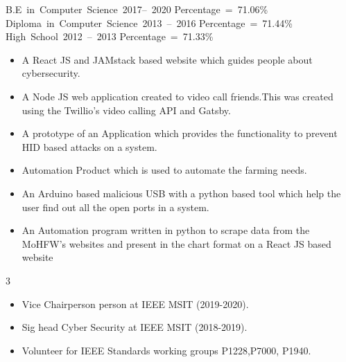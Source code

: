 \hbox {B.E  in Computer Science 2017-- 2020}
\hbox {Percentage = 71.06\%}
\hbox {Diploma in Computer Science   2013 -- 2016}
\hbox {Percentage = 71.44\%}
\hbox {High School   2012 -- 2013}
\hbox {Percentage = 71.33\%}

\begin{itemize}
\item A React JS and JAMstack based website which guides people about cybersecurity. 
\end{itemize}
\begin{itemize}
\item A Node JS web application created to video call friends.This was created using the Twillio's video calling  API and Gatsby.  
\end{itemize}
\begin{itemize}
\item A prototype of an Application which provides the functionality to prevent HID based attacks on a system.
\end{itemize}
\begin{itemize}
\item Automation Product which is used to automate the farming needs.
\end{itemize}
\begin{itemize}
\item An Arduino based malicious USB with a python based tool which help the user find out all the open ports in a system.  
\end{itemize}
\begin{itemize}
\item An Automation program written in python to scrape data from the MoHFW's websites and present in the chart format on a React JS based website
\end{itemize}


 {3}

\begin{itemize}
\item Vice Chairperson person at IEEE MSIT (2019-2020).
\item Sig head Cyber Security at IEEE MSIT (2018-2019).
\item Volunteer for IEEE Standards working groups  P1228,P7000, P1940.
\end{itemize}


